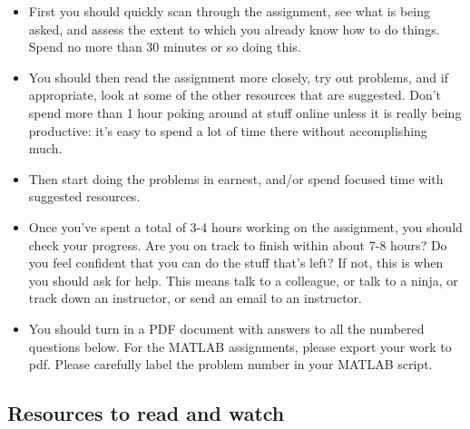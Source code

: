 \begin{itemize}
\item First you should quickly scan through the assignment, see what is
being asked, and assess the extent to which you already know how
to do things. Spend no more than 30 minutes or so doing this.

\item You should then read the assignment more closely, try out problems, and if appropriate, look at some of the other resources that are suggested. Don't spend more than 1 hour poking around at stuff online unless it is really being productive: it's easy to spend a lot of time there without accomplishing much.

\item Then start doing the problems in earnest, and/or spend focused time with suggested resources.

\item Once you've spent a total of 3-4 hours working on the assignment, you should check your progress. Are you on track to finish within about 7-8 hours? Do you feel confident that you can do the stuff that's left? If not, this is when you should ask for help. This means talk to a colleague, or talk to a ninja, or track down an instructor, or send an email to an instructor.

\item You should turn in a PDF document with answers to all the numbered questions below. For the MATLAB assignments, please export your work to pdf. Please carefully label the problem number in your MATLAB script.

\end{itemize}

\subsection{Resources to read and watch}

